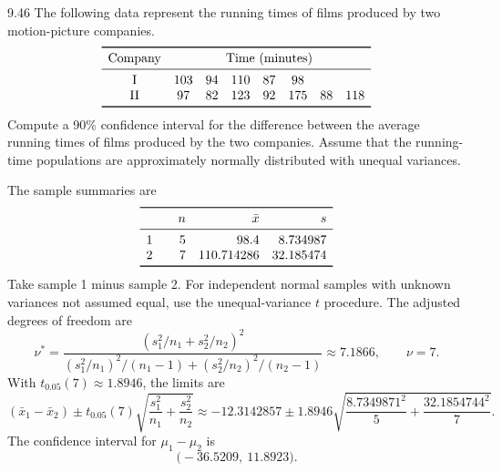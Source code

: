 \documentclass[11pt,oneside]{article}
\begin{document}
\begin{exercise}{9.46}
The following data represent the running times of films produced by two motion-picture companies.
\[
\begin{array}{cccccccc}\toprule
\text{Company} & \multicolumn{7}{c}{\text{Time (minutes)}}\\\midrule
\text{I} & 103 & 94 & 110 & 87 & 98 &  & \\
\text{II} & 97 & 82 & 123 & 92 & 175 & 88 & 118\\
\bottomrule\end{array}
\]
Compute a 90\% confidence interval for the difference between the average running times of films produced by the two companies. Assume that the running-time populations are approximately normally distributed with unequal variances.
\end{exercise}
\begin{solution}
The sample summaries are
\[
\begin{array}{c@{\qquad}rrr}\toprule &n&\bar x&s\\\midrule 1&5&98.4&8.734987\\2&7&110.714286&32.185474\\\bottomrule\end{array}
\]
Take sample 1 minus sample 2. For independent normal samples with unknown variances not assumed equal, use the unequal-variance $t$ procedure. The adjusted degrees of freedom are
\[
\nu^*=\frac{(s_1^2/n_1+s_2^2/n_2)^2}{(s_1^2/n_1)^2/(n_1-1)+(s_2^2/n_2)^2/(n_2-1)}\approx7.1866,\qquad \nu=7.
\]
 With $t_{0.05}(7)\approx1.8946$, the limits are
\[
(\bar x_1-\bar x_2)\pm t_{0.05}(7)\sqrt{\frac{s_1^2}{n_1}+\frac{s_2^2}{n_2}}\approx -12.3142857\pm 1.8946\sqrt{\frac{8.7349871^2}{5}+\frac{32.1854744^2}{7}}.
\]
The confidence interval for $\mu_1-\mu_2$ is 
\[
\boxed{\bigl(-36.5209,\ 11.8923\bigr)}.
\]
\end{solution}
\end{document}
